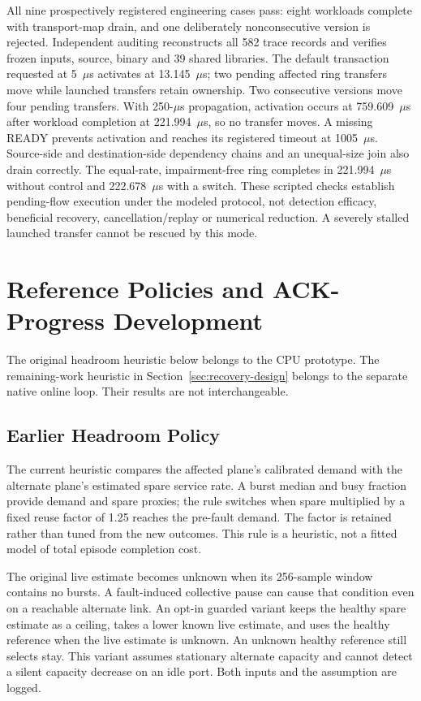 \documentclass[sigconf]{acmart}
\begin{document}
All nine prospectively registered engineering cases pass: eight workloads
complete with transport-map drain, and one deliberately nonconsecutive
version is rejected. Independent auditing reconstructs all 582 trace
records and verifies frozen inputs, source, binary and 39 shared libraries.
The default transaction requested at 5~$\mu$s activates at
13.145~$\mu$s; two pending affected ring transfers move while launched
transfers retain ownership. Two consecutive versions move four pending
transfers. With 250-$\mu$s propagation, activation occurs at
759.609~$\mu$s after workload completion at 221.994~$\mu$s, so no
transfer moves. A missing READY prevents activation and reaches its
registered timeout at 1005~$\mu$s. Source-side and destination-side
dependency chains and an unequal-size join also drain correctly. The
equal-rate, impairment-free ring completes in 221.994~$\mu$s without
control and 222.678~$\mu$s with a switch. These scripted checks establish
pending-flow execution under the modeled protocol, not detection efficacy,
beneficial recovery, cancellation/replay or numerical reduction. A
severely stalled launched transfer cannot be rescued by this mode.

\section{Reference Policies and ACK-Progress Development}
\label{app:online}
The original headroom heuristic below belongs to the CPU prototype.
The remaining-work heuristic in Section~\ref{sec:recovery-design} belongs
to the separate native online loop. Their results are not interchangeable.

\subsection{Earlier Headroom Policy}
The current heuristic compares the affected plane's calibrated demand
with the alternate plane's estimated spare service rate. A burst median
and busy fraction provide demand and spare proxies; the rule switches
when spare multiplied by a fixed reuse factor of 1.25 reaches the
pre-fault demand. The factor is retained rather than tuned from the new
outcomes. This rule is a heuristic, not a fitted model of total episode
completion cost.

The original live estimate becomes unknown when its 256-sample window
contains no bursts. A fault-induced collective pause can cause that
condition even on a reachable alternate link. An opt-in guarded variant
keeps the healthy spare estimate as a ceiling, takes a lower known live
estimate, and uses the healthy reference when the live estimate is
unknown. An unknown healthy reference still selects stay. This variant
assumes stationary alternate capacity and cannot detect a silent capacity
decrease on an idle port. Both inputs and the assumption are logged.
\end{document}

